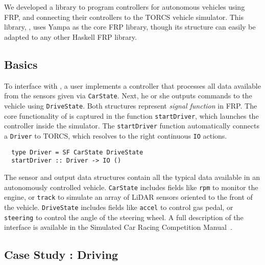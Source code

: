 \section{\ourLib}

We developed a library to program controllers for autonomous vehicles using FRP, and connecting their controllers to the TORCS vehicle simulator.
This library, \mbox{\ourLib}, uses Yampa as the core FRP library, though its structure can easily be adapted to any other Haskell FRP library.

\subsection{Basics}

To interface with \ourLib, a user implements a controller that processes all data available from the sensors given via \texttt{CarState}. 
Next, he or she outputs commands to the vehicle using \texttt{DriveState}.
Both structures represent \textit{signal function} in FRP.
The core functionality of \ourLib is captured in the function \texttt{startDriver}, which launches the controller inside the simulator.
The \texttt{startDriver} function automatically connects a \texttt{Driver} to TORCS, which resolves to the right continuous \texttt{IO} actions.

\vspace{0.2em}
\begin{lstlisting}
  type Driver = SF CarState DriveState
  startDriver :: Driver -> IO ()
\end{lstlisting}
\vspace{0.2em}

\noindent The sensor and output data structures contain all the typical data available in an autonomously controlled vehicle.
\texttt{CarState} includes fields like \texttt{rpm} to monitor the engine, or \texttt{track} to simulate an array of LiDAR sensors oriented to the front of the vehicle.
\texttt{DriveState} includes fields like \texttt{accel} to control gas pedal, or \texttt{steering} to control the angle of the steering wheel.
A full description of the interface is available in the Simulated Car Racing Competition Manual~\cite{SCRCManual}. 

\subsection{Case Study : Driving}


